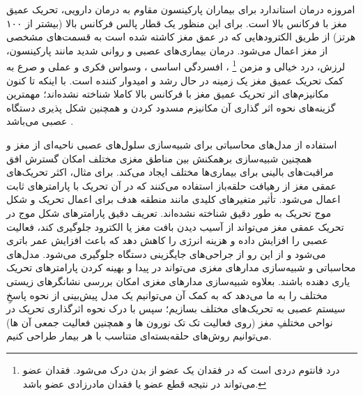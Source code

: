 امروزه درمان استاندارد برای بیماران پارکینسون مقاوم به درمان دارویی، تحریک عمیق مغز با فرکانس بالا
است. برای این منظور یک قطار پالس فرکانس بالا (بیشتر از ۱۰۰ هرتز) از طریق الکترودهایی که در عمق مغز کاشته شده است به قسمت‌های مشخصی از مغز اعمال می‌شود. درمان بیماری‌های عصبی و روانی شدید مانند پارکینسون، لرزش، درد خیالی و مزمن
\footnote{درد فانتوم دردی است که در فقدان یک عضو از بدن درک می‌شود. فقدان عضو می‌تواند در نتیجه قطع عضو یا فقدان مادرزادی عضو باشد.}
، افسردگی اساسی
، وسواس فکری و عملی
 و صرع به کمک تحریک عمیق مغز یک زمینه در حال رشد و امیدوار کننده است. با اینکه تا کنون مکانیزم‌های اثر تحریک عمیق مغز با فرکانس بالا کاملا شناخته نشده‌اند؛
مهمترین گزینه‌های نحوه اثر گذاری آن مکانیزم مسدود کردن
و همچنین شکل پذیری دستگاه عصبی می‌باشد
\cite{benabid2005putative}.

استفاده از مدل‌های محاسباتی برای شبیه‌سازی سلول‌های عصبی ناحیه‌ای از مغز 
و همچنین شبیه‌سازی برهمکنش  بین مناطق مغزی مختلف امکان گسترش افق مراقبت‌های بالینی برای بیماری‌ها
 مختلف ایجاد می‌کند. برای مثال، اکثر تحریک‌های عمقی مغز از رهیافت حلقه‌باز
استفاده می‌کنند که در آن تحریک با پارامترهای ثابت اعمال می‌شود. تأثیر متغیرهای کلیدی مانند منطقه هدف برای اعمال تحریک و شکل موج تحریک به طور دقیق شناخته نشده‌اند.
تعریف دقیق پارامترهای شکل موج در تحریک عمقی مغز می‌تواند از آسیب دیدن بافت مغز یا الکترود جلوگیری کند، فعالیت عصبی را افزایش داده و هزینه انرژی را کاهش دهد که باعث افزایش عمر باتری می‌شود و از این رو از جراحی‌های جایگزینی دستگاه جلوگیری می‌شود. مدل‌های محاسباتی و شبیه‌سازی مدارهای مغزی می‌تواند در پیدا و بهینه کردن پارامترهای تحریک یاری دهنده باشند. بعلاوه شبیه‌سازی مدارهای مغزی امکان بررسی نشانگرهای زیستی مختلف را به ما می‌دهد که به کمک آن می‌توانیم یک مدل پیش‌بینی از نحوه پاسخِ سیستم عصبی به تحریک‌های مختلف بسازیم؛ سپس با درک نحوه اثرگذاری تحریک در نواحی مختلفِ مغز (روی فعالیت تک تک نورون ها و همچنین فعالیت جمعی آن ها) می‌توانیم روش‌های حلقه‌بسته‌ای
متناسب با هر بیمار طراحی کنیم. 

